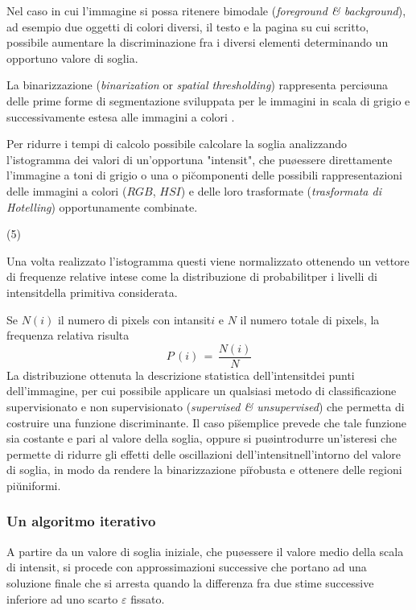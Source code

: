 Nel caso in cui l'immagine si possa ritenere bimodale ({\it foreground \& background}),
ad esempio due oggetti di colori diversi, il testo e la pagina su cui \e scritto,
\e possibile aumentare la discriminazione fra i diversi elementi
determinando un opportuno valore di soglia.

La binarizzazione ({\it binarization} or {\it spatial thresholding}) rappresenta perci\o una delle
prime forme di segmentazione sviluppata per le immagini in scala di grigio e successivamente
estesa alle immagini a colori \cite{Lucchese}.

Per ridurre i tempi di calcolo \e possibile calcolare la soglia  analizzando l'istogramma
dei valori di un'opportuna "intensit\aac", che pu\o essere direttamente l'immagine a toni di grigio
o una o pi\u componenti delle possibili rappresentazioni delle immagini a colori
($RGB$, $HSI$) e delle loro trasformate ({\it trasformata di Hotelling}) opportunamente
combinate.

\vs(5)

Una volta realizzato l'istogramma questi viene normalizzato ottenendo un vettore
di frequenze relative intese come la distribuzione di probabilit\a per i livelli
di intensit\a della primitiva considerata.

Se $N(i)$ \e il numero di pixels con intansit\a $i$ e $N$ \e il numero totale di pixels,
la frequenza relativa risulta
$$
P\,(i)\,=\,\frac{N(i)}{N} 
$$
La distribuzione ottenuta \e la descrizione statistica dell'intensit\a dei punti
dell'immagine, per cui \e possibile applicare un qualsiasi metodo di classificazione
supervisionato e non supervisionato ({\it supervised \& unsupervised}) che permetta
di costruire una funzione discriminante.
Il caso pi\u semplice prevede che tale funzione sia costante e pari al valore della
soglia, oppure si pu\o introdurre un'isteresi che permette di ridurre gli effetti
delle oscillazioni dell'intensit\a nell'intorno del valore di soglia, in modo
da rendere la binarizzazione pi\u robusta e ottenere delle regioni pi\u uniformi.

\subsubsection{Un algoritmo iterativo}

A partire da un valore di soglia iniziale, che pu\o essere il valore medio della
scala di intensit\aac, si procede con approssimazioni successive che portano ad una
soluzione finale che si arresta quando la differenza fra due stime successive
\e inferiore ad uno scarto $\varepsilon$ fissato.

